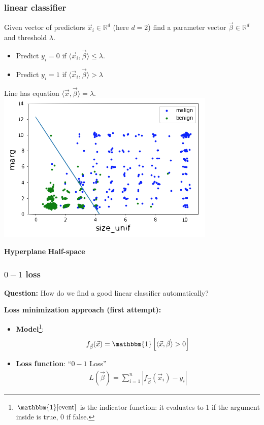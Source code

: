\documentclass[handout,compress]{beamer}
\newcommand{\R}{\mathbb{R}}
\begin{document}
\begin{frame}
	\frametitle{linear classifier}
	\begin{center}
		Given vector of predictors $\vec{x}_i \in \R^d$ (here $d = 2$) find a parameter vector $\vec{\beta} \in \R^d$ and threshold $\lambda$.
		\begin{itemize}
			\item Predict $y_i = 0$ if $\langle \vec{x}_i,\vec{\beta}\rangle \leq \lambda$.
			\item Predict $y_i = 1$ if $\langle \vec{x}_i,\vec{\beta}\rangle > \lambda$
		\end{itemize} 
		Line has equation $\langle \vec{x},\vec{\beta}\rangle  = \lambda$. 
		\includegraphics[width=.55\textwidth]{linear_classifier.png}
		
		\vspace{-1em}
		\textbf{Hyperplane}		\hspace{3em} \textbf{Half-space}		
	\end{center}
\end{frame}



\begin{frame}
	\frametitle{$0-1$ loss}
	\textbf{Question:} How do we find a good linear classifier automatically?
	
	\textbf{Loss minimization approach (first attempt):}
	\begin{itemize}
		\item \textbf{Model}\footnote{$\mathbbm{1}[\text{event}]$ is the indicator function: it evaluates to 1 if the argument inside is true, 0 if false.}: 
		\begin{align*}
			f_{\vec{\beta}}(\vec{x}) = \mathbbm{1}\left[\langle \vec{x},\vec{\beta}\rangle > 0\right]
		\end{align*}
		\item \textbf{Loss function}: ``$0-1$ Loss''
		\begin{align*}
		L(\vec{\beta}) = \sum_{i=1}^n |f_{\vec{\beta}}(\vec{x}_i) -y_i|
		\end{align*}
	\end{itemize}
\end{frame}
\end{document}

